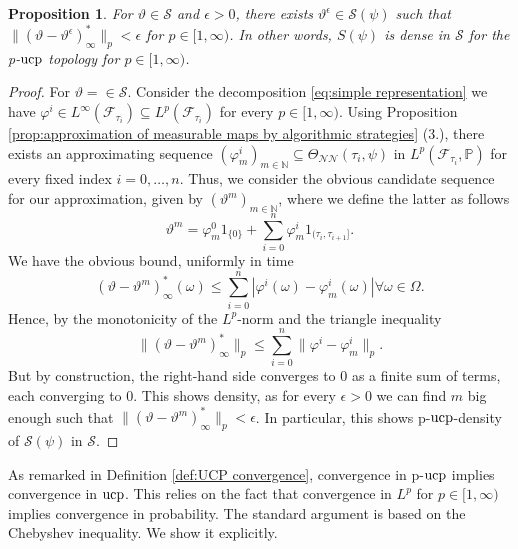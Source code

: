 \documentclass[11pt,a4paper,twoside,openany]{report}
\numberwithin{equation}{section}
\theoremstyle{plain} %
\newtheorem{proposition}[theorem]{Proposition}
\theoremstyle{definition} %
\theoremstyle{remark} %
\begin{document}
\begin{proposition}\label{prop:p-UCP density of S}
    For \(\vartheta\in\mathcal{S}\) and \(\epsilon>0\), there exists \(\vartheta^{\epsilon}\in\mathcal{S}(\psi)\) such that \(\lVert(\vartheta-\vartheta^{\epsilon})_{\infty}^*\rVert_p<\epsilon\) for \(p\in[1,\infty)\). In other words, \(S(\psi)\) is dense in \(\mathcal{S}\) for the p-\(\rm{ucp}\) topology for \(p\in[1,\infty)\).
\end{proposition}
\begin{proof}
For \(\vartheta=\in\mathcal{S}\). Consider the decomposition \eqref{eq:simple representation} we have \(\varphi^i\in L^{\infty}(\mathcal{F}_{\tau_i})\subseteq L^p(\mathcal{F}_{\tau_i})\) for every \(p\in[1,\infty)\). Using Proposition \ref{prop:approximation of measurable maps by algorithmic strategies} (3.), there exists an approximating sequence \((\varphi^i_m)_{m\in\mathbb{N}}\subseteq\Theta_{\mathcal{NN}}(\tau_i,\psi)\) in \(L^p(\mathcal{F}_{\tau_i},\mathbb{P})\) for every fixed index \(i=0,\dots,n\). Thus, we consider the obvious candidate sequence for our approximation, given by \((\vartheta^m)_{m\in\mathbb{N}}\), where we define the latter as follows
\begin{equation*}
    \vartheta^m = \varphi^0_m1_{\{0\}}+\sum_{i=0}^n\varphi^i_m1_{(\tau_i,\tau_{i+1}]}.
\end{equation*}
We have the obvious bound, uniformly in time
\begin{equation*}
   (\vartheta-\vartheta^m)_{\infty}^*(\omega)\leq \sum_{i=0}^n|\varphi^i(\omega)-\varphi^i_m(\omega)|\forall\omega\in\Omega.
\end{equation*}
Hence, by the monotonicity of the \(L^p\)-norm and the triangle inequality
\begin{equation*}
    \lVert (\vartheta-\vartheta^m)_{\infty}^*\rVert_{p}\leq\sum_{i=0}^n\lVert \varphi^i-\varphi^i_m\rVert_p.
\end{equation*}
But by construction, the right-hand side converges to \(0\) as a finite sum of terms, each converging to \(0\). This shows density, as for every \(\epsilon>0\) we can find \(m\) big enough such that \(\lVert (\vartheta-\vartheta^m)_{\infty}^*\rVert_{p}<\epsilon\). In particular, this shows p-\(\rm{ucp}\)-density of \(\mathcal{S}(\psi)\) in \(\mathcal{S}\).
\end{proof}
As remarked in Definition \ref{def:UCP convergence}, convergence in p-\(\rm{ucp}\) implies convergence in \(\rm{ucp}\). This relies on the fact that convergence in \(L^p\) for \(p\in[1,\infty)\) implies convergence in probability. The standard argument is based on the Chebyshev inequality. We show it explicitly. 
\end{document}

